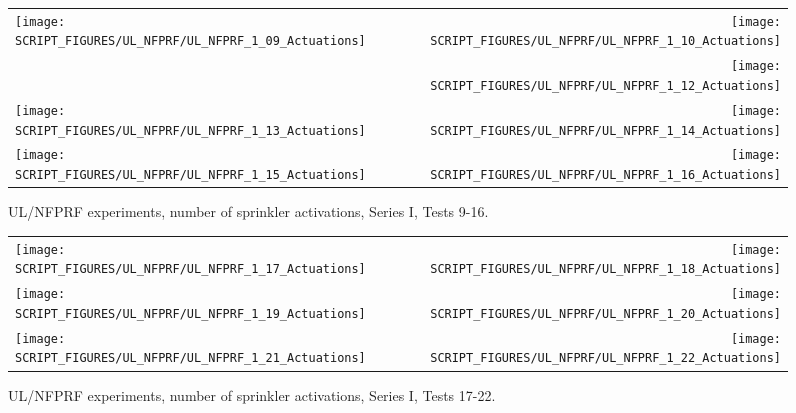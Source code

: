 \begin{figure}[p]
\begin{tabular*}{\textwidth}{l@{\extracolsep{\fill}}r}
\texttt{[image: SCRIPT\_FIGURES/UL\_NFPRF/UL\_NFPRF\_1\_09\_Actuations]} &
\texttt{[image: SCRIPT\_FIGURES/UL\_NFPRF/UL\_NFPRF\_1\_10\_Actuations]} \\
&
\texttt{[image: SCRIPT\_FIGURES/UL\_NFPRF/UL\_NFPRF\_1\_12\_Actuations]} \\
\texttt{[image: SCRIPT\_FIGURES/UL\_NFPRF/UL\_NFPRF\_1\_13\_Actuations]} &
\texttt{[image: SCRIPT\_FIGURES/UL\_NFPRF/UL\_NFPRF\_1\_14\_Actuations]} \\
\texttt{[image: SCRIPT\_FIGURES/UL\_NFPRF/UL\_NFPRF\_1\_15\_Actuations]} &
\texttt{[image: SCRIPT\_FIGURES/UL\_NFPRF/UL\_NFPRF\_1\_16\_Actuations]} \\
\end{tabular*}
\caption[UL/NFPRF experiments, number of sprinkler activations, Series I, Tests 9-16]{UL/NFPRF experiments, number of sprinkler activations, Series I, Tests 9-16.}
\label{UL_NFPRF_2}
\end{figure}

\begin{figure}[p]
\begin{tabular*}{\textwidth}{l@{\extracolsep{\fill}}r}
\texttt{[image: SCRIPT\_FIGURES/UL\_NFPRF/UL\_NFPRF\_1\_17\_Actuations]} &
\texttt{[image: SCRIPT\_FIGURES/UL\_NFPRF/UL\_NFPRF\_1\_18\_Actuations]} \\
\texttt{[image: SCRIPT\_FIGURES/UL\_NFPRF/UL\_NFPRF\_1\_19\_Actuations]} &
\texttt{[image: SCRIPT\_FIGURES/UL\_NFPRF/UL\_NFPRF\_1\_20\_Actuations]} \\
\texttt{[image: SCRIPT\_FIGURES/UL\_NFPRF/UL\_NFPRF\_1\_21\_Actuations]} &
\texttt{[image: SCRIPT\_FIGURES/UL\_NFPRF/UL\_NFPRF\_1\_22\_Actuations]}
\end{tabular*}
\caption[UL/NFPRF experiments, number of sprinkler activations, Series I, Tests 17-22]{UL/NFPRF experiments, number of sprinkler activations, Series I, Tests 17-22.}
\label{UL_NFPRF_3}
\end{figure}

